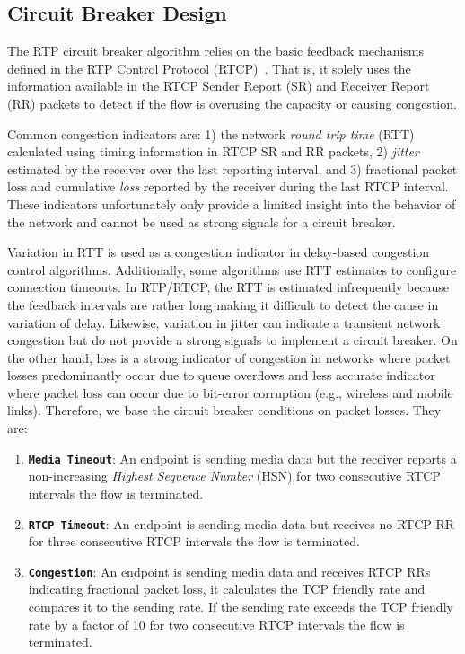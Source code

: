 \subsection{Circuit Breaker Design}

The RTP circuit breaker algorithm relies on the basic feedback mechanisms
defined in the RTP Control Protocol (RTCP)~\cite{rfc3550}. That is, it solely
uses the information available in the RTCP Sender Report (SR) and Receiver
Report (RR) packets to detect if the flow is overusing the capacity or causing
congestion.

Common congestion indicators are: 1) the network \emph{round trip time} (RTT)
calculated  using timing information in RTCP SR and RR packets, 2)
\emph{jitter} estimated by the receiver over the last reporting interval, and
3) fractional packet loss and cumulative \emph{loss} reported by the receiver
during the last RTCP interval. These indicators  unfortunately only provide a
limited insight into the behavior of the network and cannot be used as strong
signals for a circuit breaker.

Variation in RTT is used as a congestion indicator in delay-based congestion
control algorithms. Additionally, some algorithms use RTT estimates to
configure connection timeouts. In RTP/RTCP, the RTT is estimated infrequently
because the feedback intervals are rather long making it difficult to detect
the cause in variation of delay. Likewise, variation in jitter can indicate a
transient network congestion but do not provide a strong signals to implement
a circuit breaker. On the other hand, loss is a strong indicator of congestion
in networks where packet losses predominantly occur due to queue overflows and
less accurate indicator where packet loss can occur due to bit-error
corruption (e.g., wireless and mobile links). Therefore, we base the circuit
breaker conditions on packet losses. They are:

\begin{enumerate}
\setlength{\itemsep}{0pt}

\item \textbf{\texttt{Media Timeout}}: An endpoint is sending media data but
the receiver reports a non-increasing \emph{Highest Sequence Number} (HSN) for
two consecutive RTCP intervals the flow is terminated.

\item \textbf{\texttt{RTCP Timeout}}: An endpoint is sending media data but
receives no RTCP RR for three consecutive RTCP intervals the flow is
terminated.

\item \textbf{\texttt{Congestion}}: An endpoint is sending media data and
receives RTCP RRs indicating fractional packet loss, it calculates the TCP
friendly rate and compares it to the sending rate. If the sending rate exceeds
the TCP friendly rate  by a factor of 10 for two consecutive RTCP intervals
the flow is terminated.

\end{enumerate}

